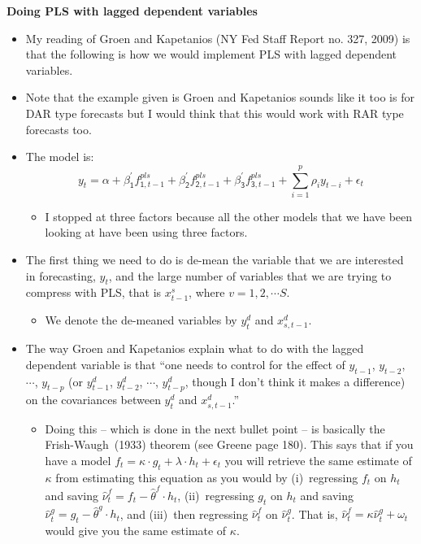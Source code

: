 \documentclass[11pt]{article}
\begin{document}
\textbf{Doing PLS with lagged dependent variables}
\begin{itemize}
\item My reading of Groen and Kapetanios (NY Fed Staff Report no. 327, 2009) is that the following is how we would implement PLS with lagged dependent variables.
\item Note that the example given is Groen and Kapetanios sounds like it too is for DAR type forecasts but I would think that this would work with RAR type forecasts too.
\item The model is:
\[ y_{t}=\alpha+\beta^{\prime}_{\mathsf{1}}f^{pls}_{\mathsf{1},t-1}+\beta^{\prime}_{\mathsf{2}}f^{pls}_{\mathsf{2},t-1}+\beta^{\prime}_{\mathsf{3}}f^{pls}_{\mathsf{3},t-1}+\sum_{i=1}^{p}\rho_{i}y_{t-i}+\epsilon_{t}\]
\begin{itemize}
\item I stopped at three factors because all the other models that we have been looking at have been using three factors.
\end{itemize}
\item The first thing we need to do is de-mean the variable that we are interested in forecasting, $y_{t}$, and the large number of variables that we are trying to compress with PLS, that is $x^{s}_{t-1}$, where $v=1,2,\cdots S$.
\begin{itemize}
\item We denote the de-meaned variables by $y^{d}_{t}$ and $x^{d}_{s,t-1}$.
\end{itemize}
\item The way Groen and Kapetanios explain what to do with the lagged dependent variable is that ``one needs to control for the effect of $y_{t-1}$, $y_{t-2}$, $\cdots$, $y_{t-p}$ (or $y^{d}_{t-1}$, $y^{d}_{t-2}$, $\cdots$, $y^{d}_{t-p}$, though I don't think it makes a difference) on the covariances between $y^{d}_{t}$ and $x^{d}_{s,t-1}$.'' 
\begin{itemize}
\item Doing this -- which is done in the next bullet point -- is basically the Frish-Waugh~(1933) theorem (see Greene page 180).  This says that if you have a model $f_{t}=\kappa\cdot g_{t}+\lambda\cdot h_{t}+\epsilon_{t}$ you will retrieve the same estimate of $\kappa$ from estimating this equation as you would by (i)~regressing $f_{t}$ on $h_{t}$ and saving $\widehat{\nu}^{f}_{t}=f_{t}-\widehat{\theta}^{f}\cdot h_{t}$,
(ii)~regressing $g_{t}$ on $h_{t}$ and saving $\widehat{\nu}^{g}_{t}=g_{t}-\widehat{\theta}^{g}\cdot h_{t}$, and (iii)~then regressing $\widehat{\nu}^{f}_{t}$ on $\widehat{\nu}^{g}_{t}$.  That is, $\widehat{\nu}^{f}_{t}=\kappa\widehat{\nu}^{g}_{t}+\omega_{t}$ would give you the same estimate of $\kappa$. 

\end{itemize}
\end{itemize}
\end{document}
